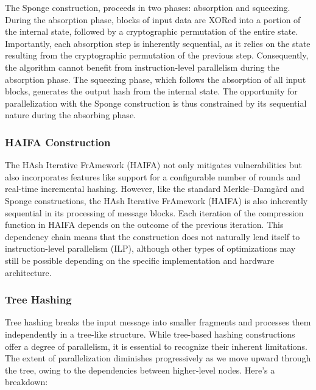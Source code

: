 \documentclass[10pt]{article}
\begin{document}
The Sponge construction,  proceeds in two phases: absorption and squeezing.
During the absorption phase, blocks of input data are XORed into a portion of the internal state, followed by a cryptographic permutation of the entire state. Importantly, each absorption step is inherently sequential, as it relies on the state resulting from the cryptographic permutation of the previous step. Consequently, the algorithm cannot benefit from instruction-level parallelism during the absorption phase.
The squeezing phase, which follows the absorption of all input blocks, generates the output hash from the internal state.
The opportunity for parallelization with the Sponge construction is thus constrained by its sequential nature during the absorbing phase.

\subsubsection{HAIFA Construction}

The HAsh Iterative FrAmework (HAIFA) not only mitigates vulnerabilities but also incorporates features like support for a configurable number of rounds and real-time incremental hashing.
However, like the standard Merkle–Damgård and Sponge constructions, the HAsh Iterative FrAmework (HAIFA) is also inherently sequential in its processing of message blocks.
Each iteration of the compression function in HAIFA depends on the outcome of the previous iteration.
This dependency chain means that the construction does not naturally lend itself to instruction-level parallelism (ILP), although other types of optimizations may still be possible depending on the specific implementation and hardware architecture.

\subsubsection{Tree Hashing}

Tree hashing breaks the input message into smaller fragments and processes them independently in a tree-like structure.
While tree-based hashing constructions offer a degree of parallelism, it is essential to recognize their inherent limitations. The extent of parallelization diminishes progressively as we move upward through the tree, owing to the dependencies between higher-level nodes. Here's a breakdown:
\end{document}
